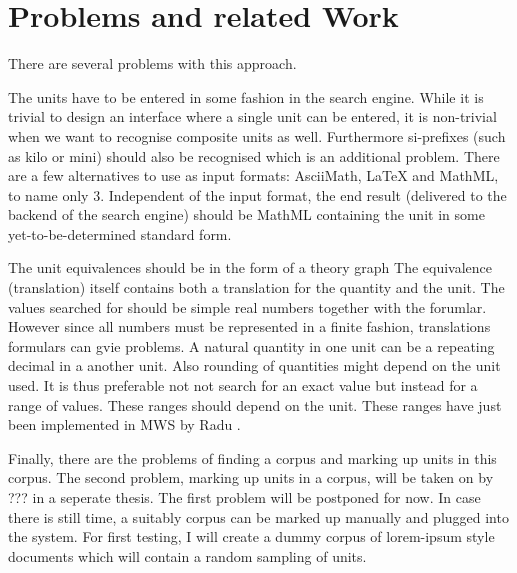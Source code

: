 \documentclass[11pt]{article}
\begin{document}
\section{Problems and related Work}
\label{sec:problems_relatedwork}

There are several problems with this approach. 

The units have to be entered in some fashion in the search engine. While it is trivial to design an interface where a single unit can be entered, it is non-trivial when we want to recognise composite units as well. Furthermore si-prefixes (such as kilo or mini) should also be recognised which is an additional problem. There are a few alternatives to use as input formats: AsciiMath, LaTeX and MathML, to name only 3. Independent of the input format, the end result (delivered to the backend of the search engine) should be MathML containing the unit in some yet-to-be-determined standard form.

The unit equivalences should be in the form of a theory graph  The equivalence
(translation) itself contains both a translation for the quantity and the unit. The values searched for should be simple real numbers together with the forumlar. However since all numbers must be represented in a finite fashion, translations formulars can gvie problems. A natural quantity in one unit can be a repeating decimal in a another unit. Also rounding of quantities might depend on the unit used. It is thus preferable not not search for an exact value but instead for a range of values. These ranges should depend on the unit. These ranges have just been implemented in MWS by Radu .  

Finally, there are the problems of finding a corpus and marking up units in this corpus. The second problem, marking up units in a corpus, will be taken on by ??? in a seperate thesis. The first problem will be postponed for now. In case there is still time, a suitably corpus can be marked up manually and plugged into the system. For first testing, I will create a dummy corpus of lorem-ipsum style documents which will contain a random sampling of units.


\end{document}
